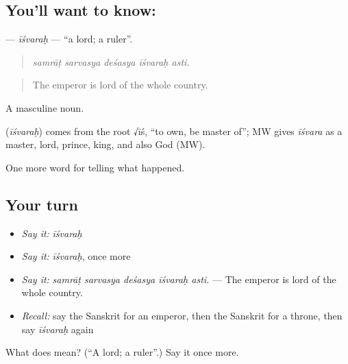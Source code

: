 \subsection*{You'll want to know: }
\textbf{} — \emph{īśvaraḥ} — \textquotedblleft{}a lord; a ruler\textquotedblright{}.

\begin{quote}
    
\end{quote}

\begin{quote}
\emph{samrāṭ sarvasya deśasya īśvaraḥ asti.}
\end{quote}

\begin{quote}
The emperor is lord of the whole country.
\end{quote}

A masculine noun.

\begin{cousinweb}
\textbf{} (\emph{īśvaraḥ}) comes from the root √īś, \textquotedblleft{}to own, be master of\textquotedblright{}; MW gives \emph{īśvara} as a master, lord, prince, king, and also God (MW).
\end{cousinweb}

\begin{grammarlens}[title={What you've built}]
One more word for telling what happened.
\end{grammarlens}

\subsection*{Your turn}
\begin{itemize}
\raggedright
  \item \emph{Say it:} \emph{īśvaraḥ}
  \item \emph{Say it:} \emph{īśvaraḥ}, once more
  \item \emph{Say it:} \emph{samrāṭ sarvasya deśasya īśvaraḥ asti.} — The emperor is lord of the whole country.
  \item \emph{Recall:} say the Sanskrit for an emperor, then the Sanskrit for a throne, then say \emph{īśvaraḥ} again
\end{itemize}

\begin{tcolorbox}[breakable,colback=teal!4,colframe=teal!35!black,title={Before you move on}]
What does  mean? (\textquotedblleft{}A lord; a ruler\textquotedblright{}.) Say it once more.
\end{tcolorbox}
